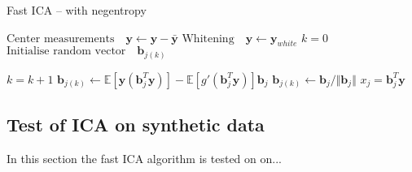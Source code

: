 \begin{algorithm}[H]
\caption{Fast ICA -- with negentropy }
\begin{algorithmic}[1]
			\State $\text{Center measurements} \quad \textbf{y} \gets \textbf{y} - \bar{\textbf{y}}$
			\State $\text{Whitening} \quad \textbf{y}\gets \textbf{y}_{white}$ 
			\EndProcedure  
			\State
			\State$k=0$            
            \State$\text{Initialise random vector} \quad \textbf{b}_{j(k)}$ 
            
               		\State $k = k+1$
                	\State $\textbf{b}_{j(k)} \gets \mathbb{E}[ \textbf{y}(\textbf{b}_{j}^T \textbf{y})] - \mathbb{E}[g'(\textbf{b}_{j}^T \textbf{y})] \textbf{b}_{j}$  
                	\State $\textbf{b}_{j(k)} \gets \textbf{b}_j/\Vert \textbf{b}_j \Vert $ 
          		\EndWhile
          		\State $x_{j} = \textbf{b}_{j}^T\textbf{y}$
          	\EndFor
          	
            \EndProcedure
        \end{algorithmic} 
        \label{alg:fastICA}
\end{algorithm}



\subsection{Test of ICA on synthetic data}
In this section the fast ICA algorithm is tested on on...


